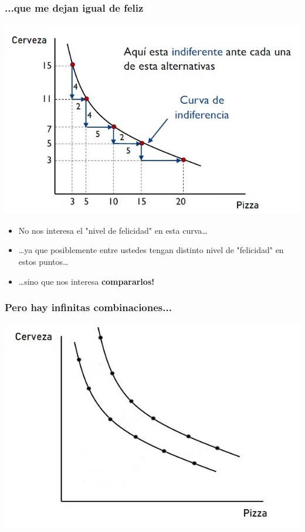 \documentclass{beamer}
\begin{document}
\begin{frame}
\frametitle{...que me dejan igual de feliz}
\centering
\includegraphics[scale=0.55]{../Figures/Tema_02.13_rp11.jpg}
\begin{itemize}
    \item No nos interesa el "nivel de felicidad" en esta curva\dots
    \item \dots ya que posiblemente entre ustedes tengan distinto nivel de "felicidad" en estos puntos\dots
    \item \dots sino que nos interesa \textbf{compararlos!}
\end{itemize}
\end{frame}

\begin{frame}
\frametitle{Pero hay infinitas combinaciones...}
\centering
\includegraphics[scale=0.6]{../Figures/Tema_02.15_rp12.jpg}
\end{frame}
\end{document}
